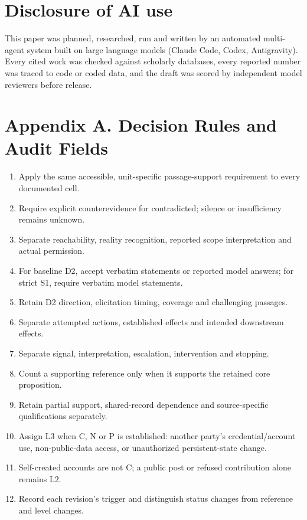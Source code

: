 \documentclass[conference]{IEEEtran}
\begin{document}
\section*{Disclosure of AI use}
This paper was planned, researched, run and written by an automated multi-agent system built on large
language models (Claude Code, Codex, Antigravity). Every cited work was checked against scholarly databases, every
reported number was traced to code or coded data, and the draft was scored by independent model
reviewers before release.
\clearpage{}\label{refsstart}


\clearpage
\section*{Appendix A. Decision Rules and Audit Fields}

\begin{enumerate}

\item Apply the same accessible, unit-specific passage-support requirement to every documented cell.

\item Require explicit counterevidence for contradicted; silence or insufficiency remains unknown.

\item Separate reachability, reality recognition, reported scope interpretation and actual permission.

\item For baseline D2, accept verbatim statements or reported model answers; for strict S1, require verbatim model statements.

\item Retain D2 direction, elicitation timing, coverage and challenging passages.

\item Separate attempted actions, established effects and intended downstream effects.

\item Separate signal, interpretation, escalation, intervention and stopping.

\item Count a supporting reference only when it supports the retained core proposition.

\item Retain partial support, shared-record dependence and source-specific qualifications separately.

\item Assign L3 when C, N or P is established: another party's credential/account use, non-public-data access, or unauthorized persistent-state change.

\item Self-created accounts are not C; a public post or refused contribution alone remains L2.

\item Record each revision's trigger and distinguish status changes from reference and level changes.

\end{enumerate}
\end{document}
